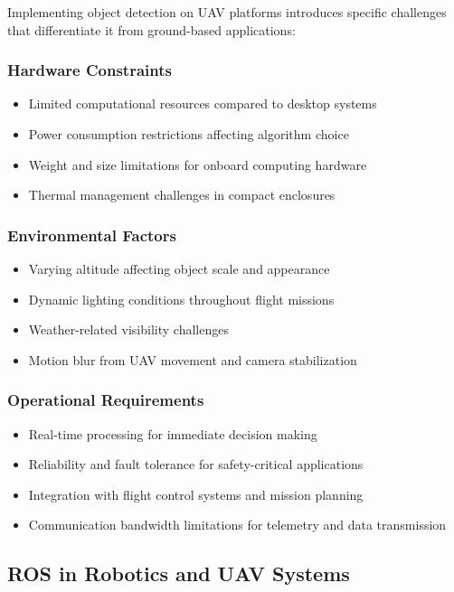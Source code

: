 \documentclass[12pt,a4paper]{article}
\begin{document}
Implementing object detection on UAV platforms introduces specific challenges that differentiate it from ground-based applications:

\subsubsection{Hardware Constraints}
\begin{itemize}
    \item Limited computational resources compared to desktop systems
    \item Power consumption restrictions affecting algorithm choice
    \item Weight and size limitations for onboard computing hardware
    \item Thermal management challenges in compact enclosures
\end{itemize}

\subsubsection{Environmental Factors}
\begin{itemize}
    \item Varying altitude affecting object scale and appearance
    \item Dynamic lighting conditions throughout flight missions
    \item Weather-related visibility challenges
    \item Motion blur from UAV movement and camera stabilization
\end{itemize}

\subsubsection{Operational Requirements}
\begin{itemize}
    \item Real-time processing for immediate decision making
    \item Reliability and fault tolerance for safety-critical applications
    \item Integration with flight control systems and mission planning
    \item Communication bandwidth limitations for telemetry and data transmission
\end{itemize}

\subsection{ROS in Robotics and UAV Systems}
\end{document}
